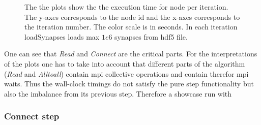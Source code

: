 \begin{figure}[ht!]
\begin{center}
{        }
    \end{center}
    \caption{%
        The the plots show the the execution time for node per iteration.
        The y-axes corresponds to the node id and the x-axes corresponds to the iteration number.
        The color scale is in seconds.
        In each iteration loadSynapses loads max $1e6$ synapses from hdf5 file.
     }%
   \label{fig:implV03}
\end{figure}
One can see that \emph{Read} and \emph{Connect} are the critical parts.
For the interpretations of the plots one has to take into account that different parts of the algorithm
(\emph{Read} and \emph{Alltoall}) contain mpi collective operations and contain therefor mpi waits.
Thus the wall-clock timings do not satisfy the pure step functionality but also the imbalance from its previous step.
Therefore a showcase run with 


\subsubsection{Connect step}

